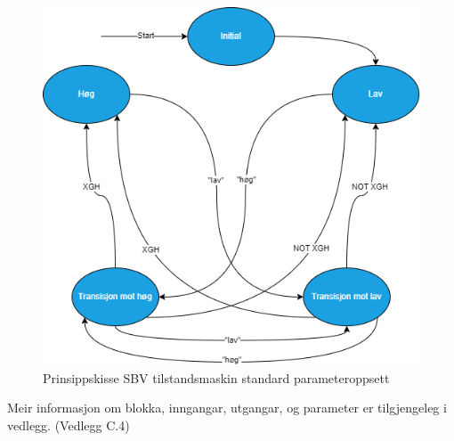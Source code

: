 \begin{figure}[htbp]
    \centering
    \includegraphics[scale=0.47]{Figurar/SBE.drawio.png}
    \caption{Prinsippskisse SBV tilstandsmaskin standard parameteroppsett}\label{fig:SBV tilstandsmaskin}
\end{figure}


Meir informasjon om blokka, inngangar, utgangar, og parameter er tilgjengeleg i vedlegg. (Vedlegg C.4)

\newpage



